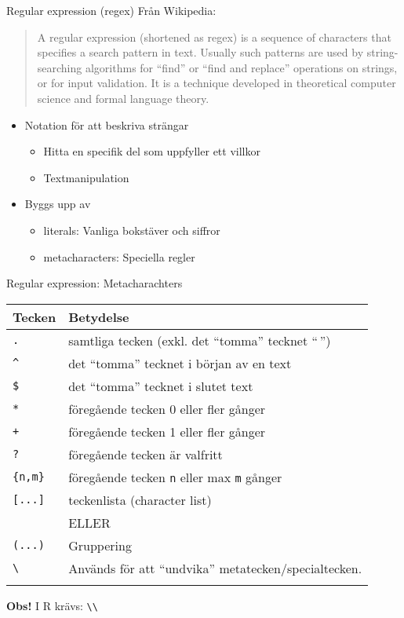 \documentclass[
  10pt,
  ignorenonframetext,
  handout]{beamer}
\providecommand{\tightlist}{%
  \setlength{\itemsep}{0pt}\setlength{\parskip}{0pt}}
\begin{document}
\begin{frame}{Regular expression (regex)}
\label{regular-expression-regex}
Från Wikipedia:

\begin{quote}
A regular expression (shortened as regex) is a sequence of characters
that specifies a search pattern in text. Usually such patterns are used
by string-searching algorithms for ``find'' or ``find and replace''
operations on strings, or for input validation. It is a technique
developed in theoretical computer science and formal language theory.
\end{quote}

\begin{itemize}
\tightlist
\item
  Notation för att beskriva strängar

  \begin{itemize}
  \tightlist
  \item
    Hitta en specifik del som uppfyller ett villkor
  \item
    Textmanipulation
  \end{itemize}
\item
  Byggs upp av

  \begin{itemize}
  \tightlist
  \item
    literals: Vanliga bokstäver och siffror
  \item
    metacharacters: Speciella regler
  \end{itemize}
\end{itemize}
\end{frame}

\begin{frame}[fragile]{Regular expression: Metacharachters}
\label{regular-expression-metacharachters}
\begin{longtable}[]{@{}ll@{}}
\toprule\noalign{}
Tecken & Betydelse \\
\midrule\noalign{}
\endhead
\texttt{.} & samtliga tecken (exkl. det ``tomma'' tecknet ``\,'') \\
\texttt{\^{}} & det ``tomma'' tecknet i början av en text \\
\texttt{\$} & det ``tomma'' tecknet i slutet text \\
\texttt{*} & föregående tecken 0 eller fler gånger \\
\texttt{+} & föregående tecken 1 eller fler gånger \\
\texttt{?} & föregående tecken är valfritt \\
\texttt{\{n,m\}} & föregående tecken \texttt{n} eller max \texttt{m}
gånger \\
\texttt{{[}...{]}} & teckenlista (character list) \\
\textbar{} & ELLER \\
\texttt{(...)} & Gruppering \\
\texttt{\textbackslash{}} & Används för att ``undvika''
metatecken/specialtecken. \\
\bottomrule\noalign{}
\end{longtable}

\textbf{Obs!} I R krävs: \texttt{\textbackslash{}\textbackslash{}}
\end{frame}
\end{document}
